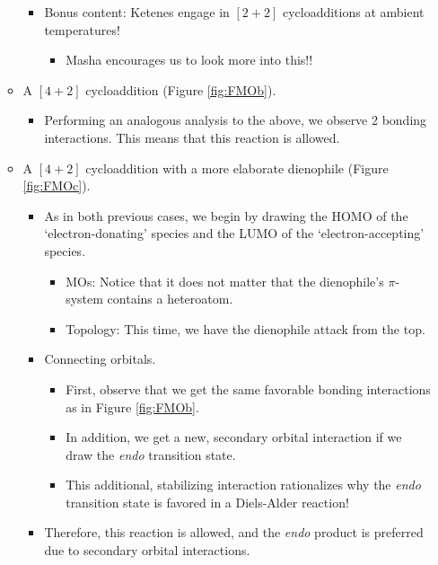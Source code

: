 \documentclass[../notes.tex]{subfiles}
\begin{document}
\begin{itemize}
\begin{itemize}
\begin{itemize}
            \item Bonus content: Ketenes engage in $[2+2]$ cycloadditions at ambient temperatures!
            \begin{itemize}
                \item Masha encourages us to look more into this!!
            \end{itemize}
        \end{itemize}
        \item A $[4+2]$ cycloaddition (Figure \ref{fig:FMOb}).
        \begin{itemize}
            \item Performing an analogous analysis to the above, we observe 2 bonding interactions. This means that this reaction is allowed.
        \end{itemize}
        \item A $[4+2]$ cycloaddition with a more elaborate dienophile (Figure \ref{fig:FMOc}).
        \begin{itemize}
            \item As in both previous cases, we begin by drawing the HOMO of the `electron-donating' species and the LUMO of the `electron-accepting' species.
            \begin{itemize}
                \item MOs: Notice that it does not matter that the dienophile's $\pi$-system contains a heteroatom.
                \item Topology: This time, we have the dienophile attack from the top.
            \end{itemize}
            \item Connecting orbitals.
            \begin{itemize}
                \item First, observe that we get the same favorable bonding interactions as in Figure \ref{fig:FMOb}.
                \item In addition, we get a new, secondary orbital interaction if we draw the \emph{endo} transition state.
                \item This additional, stabilizing interaction rationalizes why the \emph{endo} transition state is favored in a Diels-Alder reaction!
            \end{itemize}
            \item Therefore, this reaction is allowed, and the \emph{endo} product is preferred due to secondary orbital interactions.
        \end{itemize}

\end{itemize}
\end{itemize}
\end{document}
